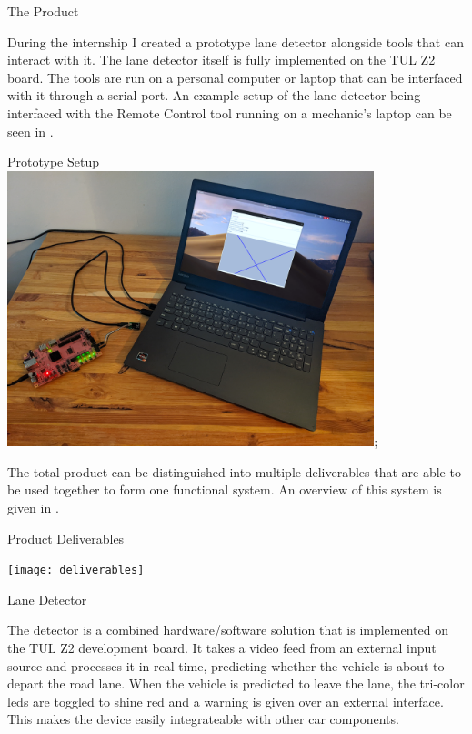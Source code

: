 \documentclass{matthijs}
\begin{document}
	\begin{hoofdstuk}{The Product}

		\setlength\parindent{1.5em}
		\setlength{\parskip}{0.5em plus 0.2em minus 0.1em}
		\linespread{1.2}
		\vspace{-2.5ex}
		
		During the internship I created a prototype lane detector alongside tools that can interact with it.
		The lane detector itself is fully implemented on the TUL Z2 board.
		The tools are run on a personal computer or laptop that can be interfaced with it through a serial port.
		An example setup of the lane detector being interfaced with the Remote Control tool running on a mechanic's laptop can be seen in .

		\begin{figuur}{Prototype Setup}
			\includegraphics[width=0.8\textwidth]{product-5.png};
		\end{figuur}

		\noindent The total product can be distinguished into multiple deliverables that are able to be used together to form one functional system.
		An overview of this system is given in .

		\begin{figuur}{Product Deliverables}
			\vspace{2ex}
			\centerline{
				\texttt{[image: deliverables]}
			}
		\end{figuur}

		\begin{paragraaf}{Lane Detector}

			The detector is a combined hardware/software solution that is implemented on the TUL Z2 development board.
			It takes a video feed from an external input source and processes it in real time, predicting whether the vehicle is about to depart the road lane.
			When the vehicle is predicted to leave the lane, the tri-color leds are toggled to shine red and a warning is given over an external interface.
			This makes the device easily integrateable with other car components.


\end{paragraaf}
\end{hoofdstuk}
\end{document}
